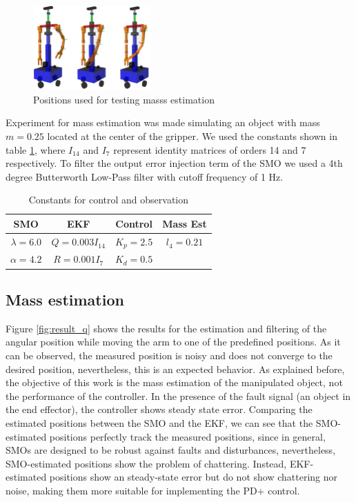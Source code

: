 \documentclass[conference,letterpaper]{ieeeconf}
\begin{document}
\begin{figure}[h!]
  \centering
  \includegraphics[width=0.4\textwidth]{Figures/test_poses.png}
  \caption{Positions used for testing masss estimation}
  \label{fig:test_poses}
\end{figure}

Experiment for mass estimation was made simulating an object with mass $m=0.25$ located at the center of the gripper. We used the constants shown in table \ref{tab:constants}, where $I_{14}$ and $I_7$ represent identity matrices of orders 14 and 7 respectively. To filter the output error injection term of the SMO we used a 4th degree Butterworth Low-Pass filter with cutoff frequency of 1 Hz. 
\begin{table}[h!]
  \centering
  \begin{tabular}{|c|c|c|c|}
    \hline
    SMO & EKF & Control & Mass Est\\
    \hline
    $\lambda=6.0$ & $Q = 0.003I_{14}$ & $K_p= 2.5$ & $l_4 = 0.21$\\
    $\alpha=4.2$ & $R = 0.001I_7$ & $K_d = 0.5$  & \\
    \hline
  \end{tabular}
  \caption{Constants for control and observation}
  \label{tab:constants}
\end{table}

\subsection{Mass estimation}
Figure \ref{fig:result_q} shows the results for the estimation and filtering of the angular position while moving the arm to one of the predefined positions. As it can be observed, the measured position is noisy and does not converge to the desired position, nevertheless, this is an expected behavior. As explained before, the objective of this work is the mass estimation of the manipulated object, not the performance of the controller. In the presence of the fault signal (an object in the end effector), the controller shows steady state error. Comparing the estimated positions between the SMO and the EKF, we can see that the SMO-estimated positions perfectly track the measured positions, since in general, SMOs are designed to be robust against faults and disturbances, nevertheless, SMO-estimated positions show the problem of chattering. Instead, EKF-estimated positions show an steady-state error but do not show chattering nor noise, making them more suitable for implementing the PD+ control. 
\end{document}
